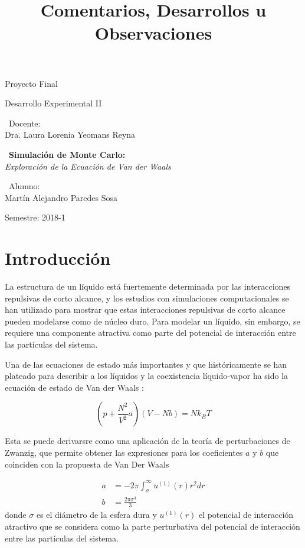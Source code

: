 \documentclass[12pt,letterpaper]{article}
\title{ Comentarios, Desarrollos u Observaciones  }
\begin{document}
\begin{titlepage}
	\centering
    \vspace*{2cm}
	{\Large Proyecto Final \par}
	\vfill
	{\Large Desarrollo Experimental II \par}
	\vfill
	{\large\ Docente:\\ Dra. Laura Lorenia Yeomans Reyna \par}
    \vfill
    {\large\ \textbf{Simulación de Monte Carlo:}\\ 
    \emph{Exploración de la Ecuación de Van der Waals}\par}
    \vfill
    {\large\ Alumno:\\ Martín Alejandro Paredes Sosa \par}
	\vfill
	{\large Semestre: 2018-1\par}
\end{titlepage}

\section{Introducción}
	
	La estructura de un líquido está fuertemente determinada por las interacciones repulsivas de corto alcance, y  los estudios con simulaciones computacionales se han utilizado para mostrar que estas interacciones repulsivas de corto alcance pueden modelarse como de núcleo duro. Para modelar un líquido, sin embargo, se requiere una componente atractiva como parte del potencial de interacción entre las partículas del sistema.  

Una de las ecuaciones de estado más importantes y que históricamente se han plateado para describir a los líquidos y la coexistencia líquido-vapor ha sido la ecuación de estado de Van der Waals \cite{Modern}:

\begin{equation}
	\left( p + \frac{N^2}{V^2}a \right) \left( V -Nb \right) = Nk_B T
	\label{VanDerWaals}
\end{equation}

Esta se puede derivarsre como una aplicación de la teoría de perturbaciones de Zwanzig\cite{Stats}, que permite obtener las expresiones para los coeficientes $a$ y $b$ que coinciden con la propuesta de Van Der Waals \cite{Stats} 

\begin{align}
	a &= -2\pi \int_{\sigma}^{\infty} u^{(1)}(r)r^2dr \label{Coef_A_1} \\
	b &= \frac{2\pi\sigma^3}{3} \label{Coef_B_1}
\end{align}
donde $\sigma$ es el diámetro de la esfera dura y $u^{(1)}(r)$ el potencial de interacción atractivo que se considera como la parte perturbativa del potencial de interacción entre las partículas del sistema. 
\end{document}
